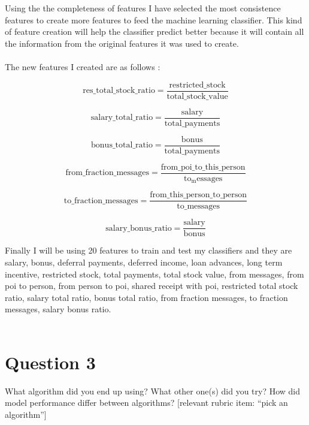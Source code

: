 \documentclass[12pt]{article}%
\begin{document}
Using the the completeness of features I have selected the most consistence features to create more features to feed the machine learning classifier. This kind of feature creation will help the classifier predict better because it will contain all the information from the original features it was used to create.
\\
\\
The new features I created are as follows :

\begin{equation}
\mathrm{res\_total\_stock\_ratio} = \frac{\mathrm{restricted\_stock}}{\mathrm{total\_stock\_value}}
\end{equation}

\begin{equation}
\mathrm{salary\_total\_ratio} = \frac{\mathrm{salary}}{\mathrm{total\_payments}}
\end{equation}

\begin{equation}
\mathrm{bonus\_total\_ratio} = \frac{\mathrm{bonus}}{\mathrm{total\_payments}}
\end{equation}

\begin{equation}
\mathrm{from\_fraction\_messages} = \frac{\mathrm{from\_poi\_to\_this\_person}}{\mathrm{to_messages}}
\end{equation}

\begin{equation}
\mathrm{to\_fraction\_messages} = \frac{\mathrm{from\_this\_person\_to\_person}}{\mathrm{to\_messages}}
\end{equation}

\begin{equation}
\mathrm{salary\_bonus\_ratio} = \frac{\mathrm{salary}}{\mathrm{bonus}}
\end{equation}

Finally I will be using 20 features to train and test my classifiers and they are salary, bonus, deferral payments, deferred income, loan advances, long term incentive, restricted stock, total payments, total stock value, from messages, from poi to person, from person to poi, shared receipt with poi, restricted total stock ratio, salary total ratio, bonus total ratio, from fraction messages, to fraction messages, salary bonus ratio.
\\
\\
\newpage

\section*{Question 3}
What algorithm did you end up using? What other one(s) did you try? How did model performance differ between algorithms?  [relevant rubric item: “pick an algorithm”]
\end{document}

